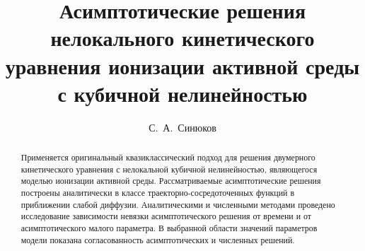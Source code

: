


\usepackage{todonotes} %

\usepackage[russian]{nla}



\fi

\title{Асимптотические решения нелокального кинетического уравнения ионизации активной среды с кубичной нелинейностью}
\author{С.~А.~Синюков
}


\maketitle

\begin{abstract}
Применяется оригинальный квазиклассический подход для решения двумерного кинетического уравнения с нелокальной кубичной нелинейностью, являющегося моделью ионизации активной среды. Рассматриваемые асимптотические решения построены аналитически в классе траекторно-сосредоточенных функций в приближении слабой диффузии. Аналитическими и численными методами проведено исследование зависимости невязки асимптотического решения от времени и от асимптотического малого параметра. В выбранной области значений параметров модели показана согласованность асимптотических и численных решений.

\end{abstract}

